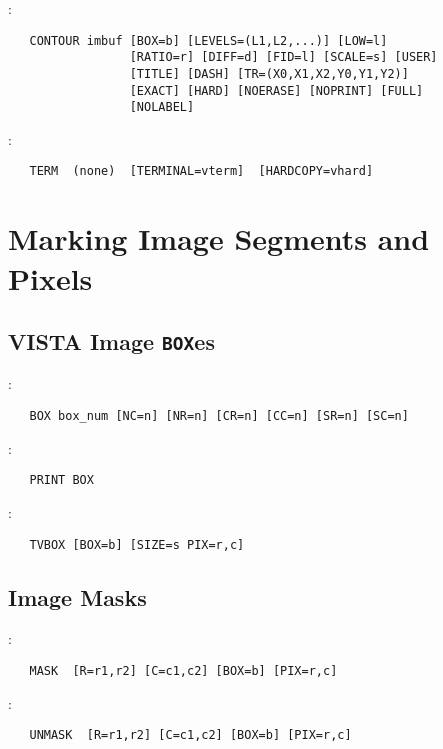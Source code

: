 \noindent {}:
\begin{verbatim}
   CONTOUR imbuf [BOX=b] [LEVELS=(L1,L2,...)] [LOW=l]
                 [RATIO=r] [DIFF=d] [FID=l] [SCALE=s] [USER]
                 [TITLE] [DASH] [TR=(X0,X1,X2,Y0,Y1,Y2)]
                 [EXACT] [HARD] [NOERASE] [NOPRINT] [FULL]
                 [NOLABEL]
\end{verbatim}

\noindent {}:
\begin{verbatim}
   TERM  (none)  [TERMINAL=vterm]  [HARDCOPY=vhard]
\end{verbatim}


\section{Marking Image Segments and Pixels}

\subsection{VISTA Image {\tt BOX}es}

:
\begin{verbatim}
   BOX box_num [NC=n] [NR=n] [CR=n] [CC=n] [SR=n] [SC=n]
\end{verbatim}

\noindent {}:
\begin{verbatim}
   PRINT BOX
\end{verbatim}

\noindent {}:
\begin{verbatim}
   TVBOX [BOX=b] [SIZE=s PIX=r,c]
\end{verbatim}

\subsection{Image Masks}

:
\begin{verbatim}
   MASK  [R=r1,r2] [C=c1,c2] [BOX=b] [PIX=r,c]
\end{verbatim}

\noindent {}:
\begin{verbatim}
   UNMASK  [R=r1,r2] [C=c1,c2] [BOX=b] [PIX=r,c]
\end{verbatim}

